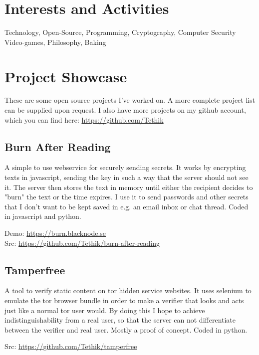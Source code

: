 \documentclass[a4paper,10pt]{article}
\begin{document}
\section{Interests and Activities}
Technology, Open-Source, Programming, Cryptography, Computer Security\\
Video-games, Philosophy, Baking

\newpage

\section{Project Showcase}
These are some open source projects I've worked on. A more complete project list can be supplied upon request. I also have more projects on my github account, which you can find here: \href{https://github.com/Tethik}{https://github.com/Tethik}\\

\subsection{Burn After Reading}
A simple to use webservice for securely sending secrets. It works by encrypting texts in javascript, sending the key in such a way that the server should not see it. The server then stores the text in memory until either the recipient decides to "burn" the text or the time expires. I use it to send passwords and other secrets that I don't want to be kept saved in e.g. an email inbox or chat thread. Coded in javascript and python.

Demo: \href{https://burn.blacknode.se}{https://burn.blacknode.se}\\
Src: \href{https://github.com/Tethik/burn-after-reading}{https://github.com/Tethik/burn-after-reading}\\

\subsection{Tamperfree}
A tool to verify static content on tor hidden service websites. It uses selenium to emulate the tor browser bundle in order to make a verifier that looks and acts just like a normal tor user would. By doing this I hope to achieve indistinguishability from a real user, so that the server can not differentiate between the verifier and real user. Mostly a proof of concept. Coded in python.

Src: \href{https://github.com/Tethik/tamperfree}{https://github.com/Tethik/tamperfree}
\end{document}

